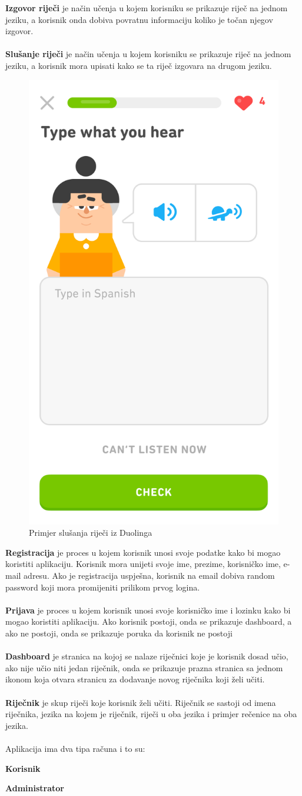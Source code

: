 		\textbf{Izgovor riječi} je način učenja u kojem korisniku se prikazuje riječ na jednom jeziku, a korisnik onda dobiva povratnu informaciju koliko je točan njegov izgovor.
		\\
		\\
		\textbf{Slušanje riječi} je način učenja u kojem korisniku se prikazuje riječ na jednom jeziku, a korisnik mora upisati kako se ta riječ izgovara na drugom jeziku.
		\begin{figure}[H]
			\centering
			\includegraphics[width=0.4\linewidth]{slike/Duolingo.png}
			\caption{Primjer slušanja riječi iz Duolinga}
			\label{fig:rijecnik}
		\end{figure}

		\textbf{Registracija} je proces u kojem korisnik unosi svoje podatke kako bi mogao koristiti aplikaciju.
		Korisnik mora unijeti svoje ime, prezime, korisničko ime, e-mail adresu.
		Ako je registracija uspješna, korisnik na email dobiva random password koji mora promijeniti prilikom prvog logina.
		\\
		\\
		\textbf{Prijava} je proces u kojem korisnik unosi svoje korisničko ime i lozinku kako bi mogao koristiti aplikaciju.
		Ako korisnik postoji, onda se prikazuje dashboard, a ako ne postoji, onda se prikazuje poruka da korisnik ne postoji
		\\
		\\
		\textbf{Dashboard} je stranica na kojoj se nalaze riječnici koje je korisnik dosad učio, ako nije učio niti jedan riječnik, onda se prikazuje prazna stranica sa jednom ikonom koja otvara stranicu za dodavanje novog riječnika koji želi učiti.
		\\
		\\
		\textbf{Riječnik} je skup riječi koje korisnik želi učiti.
		Riječnik se sastoji od imena riječnika, jezika na kojem je riječnik, riječi u oba jezika i primjer rečenice na oba jezika.
		\\
		\\
		Aplikacija ima dva tipa računa i to su:
		\begin{packed_item}
			\item \textbf{Korisnik} 
			\item \textbf{Administrator}
		\end{packed_item}

